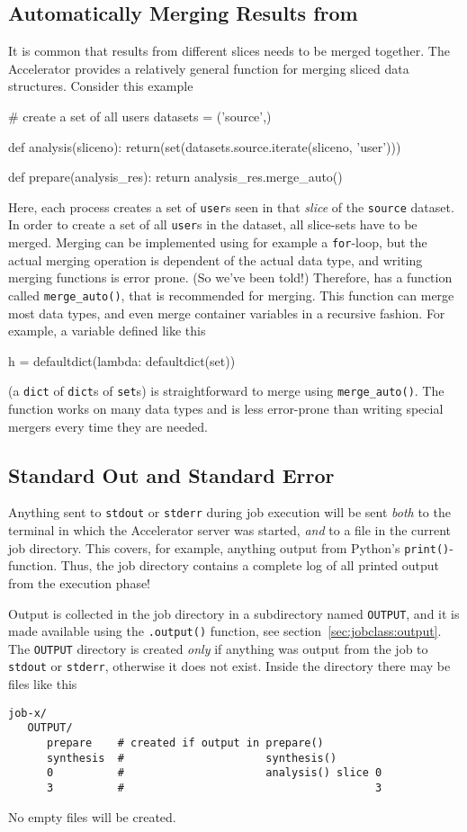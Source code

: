 \subsection{Automatically Merging Results from \analysis}
It is common that results from different slices needs to be merged
together.  The Accelerator provides a relatively general function for
merging sliced data structures.  Consider this example
\begin{python}
# create a set of all users
datasets = ('source',)
  
def analysis(sliceno):
    return(set(datasets.source.iterate(sliceno, 'user')))

def prepare(analysis_res):
    return analysis_res.merge_auto()
\end{python}
Here, each \analysis process creates a set of \texttt{user}s seen in
that \textsl{slice} of the \texttt{source} dataset.  In order to
create a set of all \texttt{user}s in the dataset, all slice-sets have
to be merged.  Merging can be implemented using for example a
\texttt{for}-loop, but the actual merging operation is dependent of
the actual data type, and writing merging functions is error
prone. (So we've been told!)  Therefore, \analysisres has a function
called \texttt{merge\_auto()}, that is recommended for merging.  This
function can merge most data types, and even merge container variables
in a recursive fashion.  For example, a variable defined like this
\begin{python}
h = defaultdict(lambda: defaultdict(set))
\end{python}
(a \texttt{dict} of \texttt{dict}s of \texttt{set}s) is
straightforward to merge using \texttt{merge\_auto()}.  The function
works on many data types and is less error-prone than writing special
mergers every time they are needed.


\subsection{Standard Out and Standard Error}
\label{sec:OUTPUT}
Anything sent to \texttt{stdout} or \texttt{stderr} during job
execution will be sent \textsl{both} to the terminal in which the
Accelerator server was started, \textsl{and} to a file in the current
job directory.  This covers, for example, anything output from
Python's \texttt{print()}-function.  Thus, the job directory contains
a complete log of all printed output from the execution phase!

Output is collected in the job directory in a subdirectory named
\texttt{OUTPUT}, and it is made available using the \texttt{.output()}
function, see section~\ref{sec:jobclass:output}.  The \texttt{OUTPUT}
directory is created \textsl{only} if anything was output from the job
to \texttt{stdout} or \texttt{stderr}, otherwise it does not exist.
Inside the directory there may be files like this
\begin{verbatim}
job-x/
   OUTPUT/
      prepare    # created if output in prepare()
      synthesis  #                      synthesis()
      0          #                      analysis() slice 0
      3          #                                       3
\end{verbatim}
No empty files will be created.


